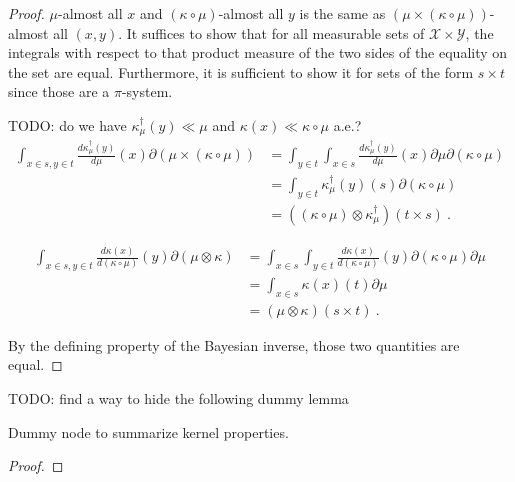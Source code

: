 \begin{proof}%
\uses{}
$\mu$-almost all $x$ and $(\kappa \circ \mu)$-almost all $y$ is the same as $(\mu \times (\kappa \circ \mu))$-almost all $(x, y)$.
It suffices to show that for all measurable sets of $\mathcal X \times \mathcal Y$, the integrals with respect to that product measure of the two sides of the equality on the set are equal. Furthermore, it is sufficient to show it for sets of the form $s \times t$ since those are a $\pi$-system.

TODO: do we have $\kappa_\mu^\dagger(y) \ll \mu$ and $\kappa(x) \ll \kappa \circ \mu$ a.e.?
\begin{align*}
\int_{x \in s, y \in t} \frac{d \kappa_\mu^\dagger(y)}{d \mu}(x) \partial (\mu \times (\kappa \circ \mu))
&= \int_{y \in t} \int_{x \in s} \frac{d \kappa_\mu^\dagger(y)}{d \mu}(x) \partial \mu \partial (\kappa \circ \mu)
\\
&= \int_{y \in t} \kappa_\mu^\dagger(y)(s) \partial (\kappa \circ \mu)
\\
&= ((\kappa \circ \mu) \otimes \kappa_\mu^\dagger) (t \times s)
\: .
\end{align*}

\begin{align*}
\int_{x \in s, y \in t} \frac{d \kappa(x)}{d(\kappa \circ \mu)}(y) \partial (\mu \otimes \kappa)
&= \int_{x \in s} \int_{y \in t} \frac{d \kappa(x)}{d(\kappa \circ \mu)}(y) \partial (\kappa \circ \mu) \partial \mu
\\
&= \int_{x \in s} \kappa(x)(t) \partial \mu
\\
&= (\mu \otimes \kappa) (s \times t)
\: .
\end{align*}

By the defining property of the Bayesian inverse, those two quantities are equal.
\end{proof}


TODO: find a way to hide the following dummy lemma
\begin{lemma}
  \label{lem:kernel_properties}
  \leanok
  Dummy node to summarize kernel properties.
\end{lemma}

\begin{proof}\leanok
{}
\end{proof}